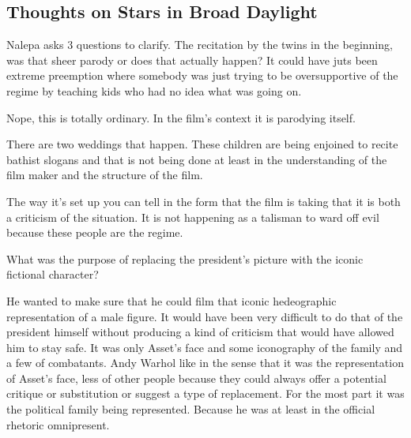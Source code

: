 \documentclass{article}
\begin{document}
\vspace{5mm}


\subsection{Thoughts on Stars in Broad Daylight}

\vspace{5mm}

Nalepa asks 3 questions to clarify.  The recitation by the twins in the beginning, was that sheer parody or does that actually happen?  It could have juts been extreme preemption where somebody was just trying to be oversupportive of the regime by teaching kids who had no idea what was going on.  

\vspace{5mm}

Nope, this is totally ordinary.  In the film's context it is parodying itself.  

\vspace{5mm}

There are two weddings that happen.  These children are being enjoined to recite bathist slogans and that is not being done at least in the understanding of the film maker and the structure of the film.  

\vspace{5mm}

The way it's set up you can tell in the form that the film is taking that it is both a criticism of the situation.  It is not happening as a talisman to ward off evil because these people are the regime.  

\vspace{5mm}

What was the purpose of replacing the president's picture with the iconic fictional character?  

\vspace{5mm}

He wanted to make sure that he could film that iconic hedeographic representation of a male figure.  It would have been very difficult to do that of the president himself without producing a kind of criticism that would have allowed him to stay safe.  It was only Asset's face and some iconography of the family and a few of combatants.  Andy Warhol like in the sense that it was the representation of Asset's face, less of other people because they could always offer a potential critique or substitution or suggest a type of replacement.  For the most part it was the political family being represented.  Because he was at least in the official rhetoric omnipresent.  
\end{document}
